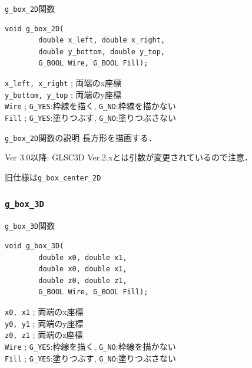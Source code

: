 \documentclass[platex,a4paper,12pt]{jsarticle}%
\begin{document}
\begin{itembox}[l]{\texttt{g\_box\_2D}関数}
\begin{verbatim}
void g_box_2D(
        double x_left, double x_right,
        double y_bottom, double y_top,
        G_BOOL Wire, G_BOOL Fill);    
\end{verbatim}
\verb|x_left, x_right| ; 両端のx座標\\
\verb|y_bottom, y_top| ; 両端のy座標\\
\verb|Wire| ; \verb|G_YES|:枠線を描く, \verb|G_NO|:枠線を描かない \\
\verb|Fill| ; \verb|G_YES|:塗りつぶす, \verb|G_NO|:塗りつぶさない
\end{itembox}

\begin{itembox}[l]{\texttt{g\_box\_2D}関数の説明}
長方形を描画する．

Ver 3.0以降: GLSC3D Ver.2.xとは引数が変更されているので注意．

旧仕様は\verb|g_box_center_2D|
\end{itembox}


\subsubsection{\texttt{g\_box\_3D}}

\begin{itembox}[l]{\texttt{g\_box\_3D}関数}
\begin{verbatim}
void g_box_3D(
        double x0, double x1,
        double x0, double x1,
        double z0, double z1,
        G_BOOL Wire, G_BOOL Fill);   
\end{verbatim}
\verb|x0, x1| ; 両端のx座標\\
\verb|y0, y1| ; 両端のy座標\\
\verb|z0, z1| ; 両端のz座標\\
\verb|Wire| ; \verb|G_YES|:枠線を描く, \verb|G_NO|:枠線を描かない \\
\verb|Fill| ; \verb|G_YES|:塗りつぶす, \verb|G_NO|:塗りつぶさない
\end{itembox}
\end{document}
